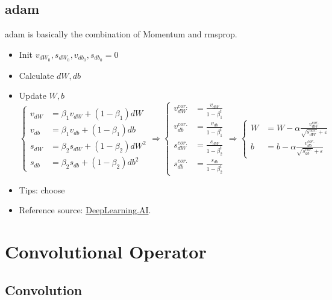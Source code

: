 \subsection{\ac{adam}}
\ac{adam} is basically the combination of Momentum and \ac{rmsprop}.
\begin{itemize}
	\item Init $v_{dW_0}, s_{dW_0}, v_{db_0}, s_{db_0}=0$
	\item Calculate $dW, db$
	\item Update $W, b$
	\begin{equation}
		\begin{cases}
			v_{dW} &= \beta_1 v_{dW} + (1-\beta_1)dW \\
			v_{db} &= \beta_1 v_{db} + (1-\beta_1)db \\
			s_{dW} &= \beta_2 s_{dW} + (1-\beta_2)dW^2 \\
			s_{db} &= \beta_2 s_{db} + (1-\beta_2)db^2
		\end{cases}
		\Rightarrow
		\begin{cases}
			v^{cor.}_{dW} &= \frac{v_{dW}}{1 - \beta_1^t} \\
			v^{cor.}_{db} &= \frac{v_{db}}{1 - \beta_1^t} \\
			s^{cor.}_{dW} &= \frac{s_{dW}}{1 - \beta_2^t} \\
			s^{cor.}_{db} &= \frac{s_{db}}{1 - \beta_2^t}
		\end{cases}
		\Rightarrow
		\begin{cases}
			W &= W - \alpha \frac{v^{cor.}_{dW}}{\sqrt{s^{cor.}_{dW}} + \varepsilon}\\
			b &= b - \alpha \frac{v^{cor.}_{db}}{\sqrt{s^{cor.}_{db}} + \varepsilon}
		\end{cases}
	\end{equation}
	\item Tips: choose 
	\item Reference source: \href{https://youtu.be/JXQT_vxqwIs}{DeepLearning.AI}.
\end{itemize}

\section{Convolutional Operator}
\subsection{Convolution}
\cite{lecun1998gradient}

